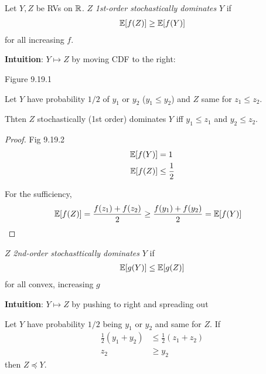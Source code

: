 \begin{definition}
  Let $Y, Z$ be RVs on $\mathbb{R}$.
  $Z$ \emph{1st-order stochastically dominates} $Y$ if
  \begin{align}
    \mathbb{E}[f(Z)] \geq \mathbb{E}[f(Y)]
  \end{align}
  for all increasing $f$.

  \textbf{Intuition}: $Y \mapsto Z$ by moving CDF to the right:

  Figure 9.19.1

\end{definition}

\begin{lemma}
  Let $Y$ have probability $1/2$ of $y_1$ or $y_2$ ($y_1 \leq y_2$)
  and $Z$ same for $z_1 \leq z_2$.

  Thten $Z$ stochastically (1st order) dominates $Y$ iff $y_1 \leq z_1$
  and $y_2 \leq z_2$.
\end{lemma}

\begin{proof}
  Fig 9.19.2
  \begin{align}
    \mathbb{E}[f(Y)] &= 1 \\
    \mathbb{E}[f(Z)] &\leq \frac{1}{2} \\
  \end{align}

  For the sufficiency,
  \begin{align}
    \mathbb{E}[f(Z)]
    &= \frac{f(z_1) + f(z_2)}{2}
    \geq \frac{f(y_1) + f(y_2)}{2}
    = \mathbb{E}[f(Y)]
  \end{align}
\end{proof}

\begin{definition}
  $Z$ \emph{2nd-order stochasttically dominates} $Y$ if
  \begin{align}
    \mathbb{E}[g(Y)] \leq \mathbb{E}[g(Z)]
  \end{align}
  for all convex, increasing $g$

  \textbf{Intuition}: $Y \mapsto Z$ by pushing to right and spreading out
\end{definition}

\begin{lemma}\label{lem:two-point-2o-sd}
  Let $Y$ have probability $1/2$ being $y_1$ or $y_2$ and same for $Z$.
  If
  \begin{align}
    \frac{1}{2}(y_1 + y_2) &\leq \frac{1}{2}(z_1 + z_2) \\
    z_2 &\geq y_2
  \end{align}
  then $Z \preceq Y$.
\end{lemma}

